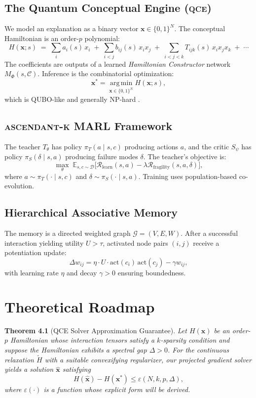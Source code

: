 \documentclass[12pt,oneside]{report}
\newcommand{\E}{\mathbb{E}}
\newcommand{\argmin}{\operatorname*{arg\,min}}
\newcommand{\framework}[1]{\textsc{#1}}
\newcommand{\qce}{\framework{qce}}
\newcommand{\ascendantk}{\framework{ascendant-k}}
\theoremstyle{definition}
\theoremstyle{plain}
\newtheorem{theorem}{Theorem}[chapter]
\theoremstyle{remark}
\begin{document}
\section{The Quantum Conceptual Engine (\qce{})}
We model an explanation as a binary vector $\bm{x}\in\{0,1\}^N$. The conceptual Hamiltonian is an order-$p$ polynomial:
\begin{equation}\label{eq:Hamiltonian}
H(\bm{x};s) \;=\; \sum_{i} a_i(s)\, x_i \;+\; \sum_{i<j} b_{ij}(s)\, x_i x_j \;+\; \sum_{i<j<k} T_{ijk}(s)\, x_i x_j x_k \;+\; \cdots
\end{equation}
The coefficients are outputs of a learned \emph{Hamiltonian Constructor} network $M_\Phi(s,\mathcal{C})$. Inference is the combinatorial optimization:
\[
\bm{x}^\ast=\argmin_{\bm{x}\in\{0,1\}^N} H(\bm{x};s),
\]
which is QUBO-like and generally NP-hard \cite{lucas2014ising}.

\section{\ascendantk{} MARL Framework}
The teacher $T_\theta$ has policy $\pi_T(a\mid s,c)$ producing actions $a$, and the critic $S_\psi$ has policy $\pi_S(\delta\mid s,a)$ producing failure modes $\delta$. The teacher's objective is:
\begin{equation}\label{eq:teacher_obj}
\max_\theta \; \E_{s,c\sim\mathcal{D}}\big[\mathcal{R}_{\text{learn}}(s,a) - \lambda \mathcal{R}_{\text{fragility}}(s,a,\delta)\big],
\end{equation}
where $a\sim\pi_T(\cdot\mid s,c)$ and $\delta\sim\pi_S(\cdot\mid s,a)$. Training uses population-based co-evolution.

\section{Hierarchical Associative Memory}
The memory is a directed weighted graph $\mathcal{G}=(V,E,W)$. After a successful interaction yielding utility $U>\tau$, activated node pairs $(i,j)$ receive a potentiation update:
\begin{equation}\label{eq:hebbian}
\Delta w_{ij} = \eta \cdot U \cdot \text{act}(c_i)\,\text{act}(c_j) - \gamma w_{ij},
\end{equation}
with learning rate $\eta$ and decay $\gamma>0$ ensuring boundedness.

\chapter{Theoretical Roadmap}
\begin{theorem}[QCE Solver Approximation Guarantee]\label{thm:qce-approx}
Let $H(\bm{x})$ be an order-$p$ Hamiltonian whose interaction tensors satisfy a $k$-sparsity condition and suppose the Hamiltonian exhibits a spectral gap $\Delta>0$. For the continuous relaxation $\widetilde{H}$ with a suitable convexifying regularizer, our projected gradient solver yields a solution $\hat{\bm{x}}$ satisfying
\[
H(\hat{\bm{x}}) - H(\bm{x}^\ast) \le \varepsilon(N,k,p,\Delta),
\]
where $\varepsilon(\cdot)$ is a function whose explicit form will be derived.
\end{theorem}
\end{document}
